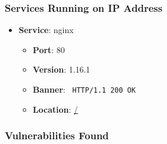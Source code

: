 \documentclass{article}
\begin{document}
\subsubsection*{Services Running on IP Address}

\begin{itemize}
    
        \item \textbf{Service}: nginx
        \begin{itemize}
            \item \textbf{Port}: 80
            \item \textbf{Version}:  1.16.1 
            \item \textbf{Banner}: \texttt{
                HTTP/1.1 200 OK
            }
            \item \textbf{Location}: \href{ / }{ / }
        \end{itemize}
    
\end{itemize}


\subsubsection*{Vulnerabilities Found}
\end{document}
